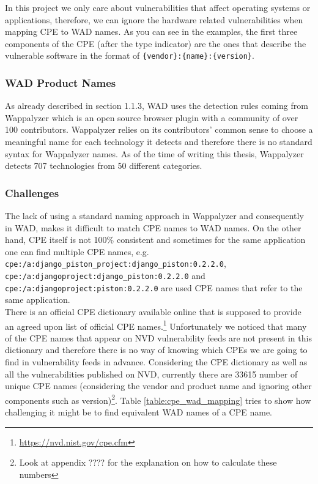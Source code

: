 In this project we only care about vulnerabilities that affect operating systems or applications, therefore, we can ignore the hardware related vulnerabilities when mapping CPE to WAD names. As you can see in the examples, the first three components of the CPE (after the type indicator) are the ones that describe the vulnerable software in the format of \texttt{\{vendor\}:\{name\}:\{version\}}.
 

\subsubsection{WAD Product Names}
As already described in section 1.1.3, WAD uses the detection rules coming from Wappalyzer which is an open source browser plugin with a community of over 100 contributors. Wappalyzer relies on its contributors' common sense to choose a meaningful name for each technology it detects and therefore there is no standard syntax for Wappalyzer names. As of the time of writing this thesis, Wappalyzer detects 707 technologies from 50 different categories.


\subsubsection{Challenges}
The lack of using a standard naming approach in Wappalyzer and consequently in WAD, makes it difficult to match CPE names to WAD names. On the other hand, CPE itself is not 100\% consistent and sometimes for the same application one can find multiple CPE names, e.g. \texttt{cpe:/a:django\_piston\_project:django\_piston:0.2.2.0}, \texttt{cpe:/a:djangoproject:django\_piston:0.2.2.0} and \texttt{cpe:/a:djangoproject:piston:0.2.2.0} are used CPE names that refer to the same application.
\\
There is an official CPE dictionary available online that is supposed to provide an agreed upon list of official CPE names.\footnote{\url{https://nvd.nist.gov/cpe.cfm}} Unfortunately we noticed that many of the CPE names that appear on NVD vulnerability feeds are not present in this dictionary and therefore there is no way of knowing which CPEs we are going to find in vulnerability feeds in advance. Considering the CPE dictionary as well as all the vulnerabilities published on NVD, currently there are 33615 number of unique CPE names (considering the vendor and product name and ignoring other components such as version)\footnote{Look at appendix ???? for the explanation on how to calculate these numbers}. Table \ref{table:cpe_wad_mapping} tries to show how challenging it might be to find equivalent WAD names of a CPE name.


